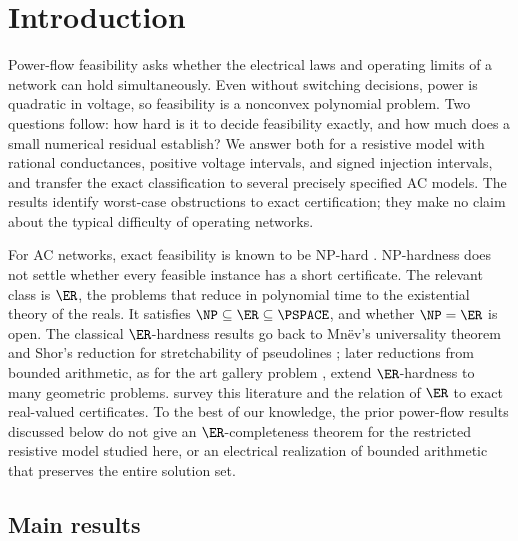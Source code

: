 \section{Introduction}
\label{sec:introduction}

Power-flow feasibility asks whether the electrical laws and operating limits
of a network can hold simultaneously. Even without switching decisions,
power is quadratic in voltage, so feasibility is a nonconvex polynomial
problem. Two questions follow: how hard is it to decide feasibility exactly,
and how much does a small numerical residual establish? We answer both for a
resistive model with rational conductances, positive voltage intervals, and
signed injection intervals, and transfer the exact classification to several
precisely specified AC models. The results identify worst-case obstructions
to exact certification; they make no claim about the typical difficulty of
operating networks.

For AC networks, exact feasibility is known to be NP-hard
\citep{BienstockVerma2019,LehmannEtAl2016}.
NP-hardness does not settle whether every feasible instance has a short
certificate. The relevant class is $\ER$, the problems that reduce in
polynomial time to the existential theory of the reals. It satisfies
$\NP\subseteq\ER\subseteq\PSPACE$, and whether $\NP=\ER$ is open. The
classical $\ER$-hardness results go back to Mn\"ev's universality theorem
\citep{Mnev1988} and Shor's reduction for stretchability of pseudolines
\citep{Shor1991}; later reductions from bounded arithmetic, as for the art
gallery problem \citep{AbrahamsenEtAl2018,AbrahamsenEtAl2022}, extend
$\ER$-hardness to many geometric problems. \citet{SchaeferEtAl2024} survey this literature and
the relation of $\ER$ to exact real-valued certificates. To the best of
our knowledge, the prior power-flow results discussed below do not give an
$\ER$-completeness theorem for the restricted resistive model studied here,
or an electrical realization of bounded arithmetic that preserves the
entire solution set.

\subsection{Main results}

